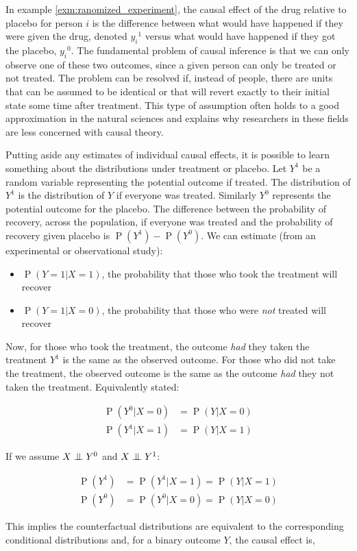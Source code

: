 \documentclass[11pt,a4paper,twoside]{report}
\newcommand{\eq}[1]{\begin{align*}#1\end{align*}}
\renewcommand{\P}[1]{\operatorname{P}\left(#1\right)}
\newcommand{\cf}[2]{{#1}^{#2}}
\theoremstyle{plain}
\theoremstyle{definition}
\newcommand{\ci}{\mathrel{\perp\mspace{-10mu}\perp}}
\begin{document}
In example \ref{exm:ranomized_experiment}, the causal effect of the drug relative to placebo for person $i$ is the difference between what would have happened if they were given the drug, denoted $\cf{y_{i}}{1}$ versus what would have happened if they got the placebo, $\cf{y_{i}}{0}$. The fundamental problem of causal inference is that we can only observe one of these two outcomes, since a given person can only be treated or not treated. The problem can be resolved if, instead of people, there are units that can be assumed to be identical or that will revert exactly to their initial state some time after treatment. This type of assumption often holds to a good approximation in the natural sciences and explains why researchers in these fields are less concerned with causal theory. 

Putting aside any estimates of individual causal effects, it is possible to learn something about the distributions under treatment or placebo. Let $\cf{Y}{1}$ be a random variable representing the potential outcome if treated. The distribution of $\cf{Y}{1}$ is the distribution of $Y$ if everyone was treated. Similarly $Y^{0}$ represents the potential outcome for the placebo. The difference between the probability of recovery, across the population, if everyone was treated and the probability of recovery given placebo is $\P{\cf{Y}{1}}-\P{\cf{Y}{0}}$. We can estimate (from an experimental or observational study):
\begin{itemize}
\item $\P{Y=1|X=1}$, the probability that those who took the treatment will recover
\item $\P{Y=1|X=0}$, the probability that those who were \emph{not} treated will recover
\end{itemize}

Now, for those who took the treatment, the outcome \emph{had} they taken the treatment $\cf{Y}{1}$ is the same as the observed outcome. For those who did not take the treatment, the observed outcome is the same as the outcome \emph{had} they not taken the treatment. Equivalently stated:

\eq{
\P{Y^{0}|X=0}&= \P{Y|X=0}\\
\P{Y^{1}|X=1}&=\P{Y|X=1}
}

If we assume $X \ci Y^{0}$ and $X \ci Y^{1}$:

\eq{
\P{Y^{1}} &= \P{Y^{1}|X=1} = \P{Y|X=1} \\
\P{Y^{0}} &= \P{Y^{0}|X=0} = \P{Y|X=0}
}

This implies the counterfactual distributions are equivalent to the corresponding conditional distributions and, for a binary outcome $Y$, the causal effect is,
\end{document}
